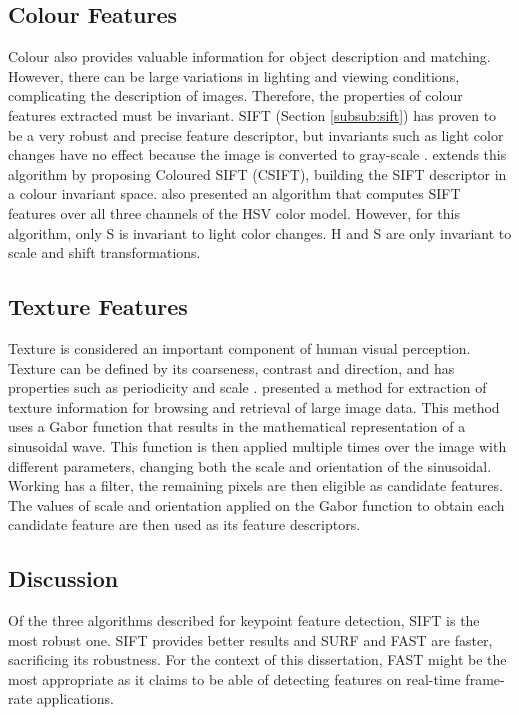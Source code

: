 \subsection{Colour Features}

Colour also provides valuable information for object description and matching. However, there can be large variations in lighting and viewing conditions, complicating the description of images. Therefore, the properties of colour features extracted must be invariant.
SIFT (Section \ref{subsub:sift}) has proven to be a very robust and precise feature descriptor, but invariants such as light color changes have no effect because the image is converted to gray-scale \cite{van2008comparison}. \citeauthor{abdel2006csift} \cite{abdel2006csift} extends this algorithm by proposing Coloured SIFT (CSIFT), building the SIFT descriptor in a colour invariant space.
\citeauthor{bosch2007representing} \cite{bosch2007representing} also presented an algorithm that computes SIFT features over all three channels of the HSV color model. However, for this algorithm, only S is invariant to light color changes. H and S are only invariant to scale and shift transformations.

\subsection{Texture Features}

Texture is considered an important component of human visual perception. Texture can be defined by its coarseness, contrast and direction, and has properties such as periodicity and scale \cite{howarth2004evaluation}.
\citeauthor{manjunath1996texture} \cite{manjunath1996texture} presented a method for extraction of texture information for browsing and retrieval of large image data. This method uses a Gabor function that results in the mathematical representation of a sinusoidal wave. This function is then applied multiple times over the image with different parameters, changing both the scale and orientation of the sinusoidal. Working has a filter, the remaining pixels are then eligible as candidate features. The values of scale and orientation applied on the Gabor function to obtain each candidate feature are then used as its feature descriptors.

\subsection{Discussion}

Of the three algorithms described for keypoint feature detection, SIFT is the most robust one. SIFT provides better results and SURF and FAST are faster, sacrificing its robustness. For the context of this dissertation, FAST might be the most appropriate as it claims to be able of detecting features on real-time frame-rate applications.

